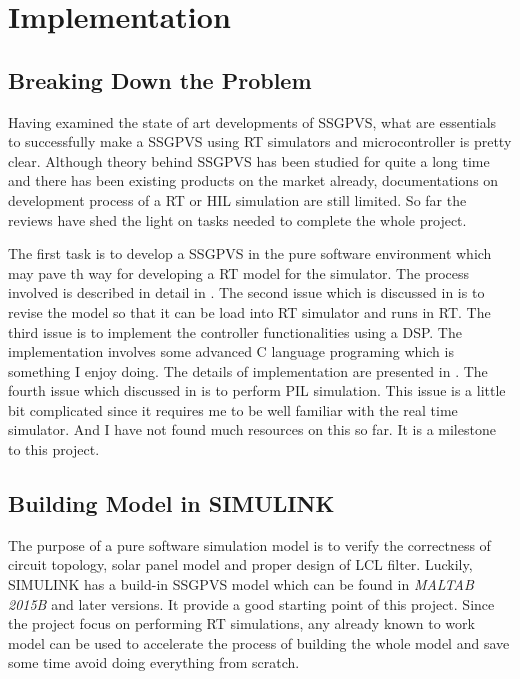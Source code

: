 \chapter{Implementation}\label{ch:problem}
\section{Breaking Down the Problem}
Having examined the state of art developments of \gls{SSGPVS}, what are essentials to successfully make a \gls{SSGPVS} using \gls{RT} simulators and microcontroller is pretty clear. Although theory behind \gls{SSGPVS}  has been studied for quite a long time and there has been existing products on the market already, documentations on development process of a \gls{RT} or \gls{HIL} simulation are still limited. So far the reviews have shed the light on tasks needed to complete the whole project. 

The first task is to develop a \gls{SSGPVS} in the pure software environment which may pave th way for developing a \gls{RT} model for the simulator. The process involved is described in detail in . The second issue which is discussed in  is to revise the model so that it can be load into \gls{RT} simulator and runs in \gls{RT}. 
The third issue is to implement the controller functionalities using a \gls{DSP}. The implementation involves some advanced C language programing which is something I enjoy doing. The details of implementation are presented in .
The fourth issue which discussed in  is to perform \gls{PIL} simulation. This issue is a little bit complicated since it requires me to be well familiar with the real time simulator. And I have not found much resources on this so far. It is a milestone to this project.
\section{Building Model in SIMULINK}\label{sec:build_simulink}
The purpose of a pure software simulation model is to verify the correctness of circuit topology, solar panel model and proper design of LCL filter. Luckily, SIMULINK has a build-in \gls{SSGPVS} model which can be found in \textit{MALTAB 2015B} and later versions\cite{solar_buildin_model}. It provide a good starting point of this project. Since the project focus on performing \gls{RT} simulations, any already known to work model can be used to accelerate the process of building the whole model and save some time avoid doing everything from scratch. 


